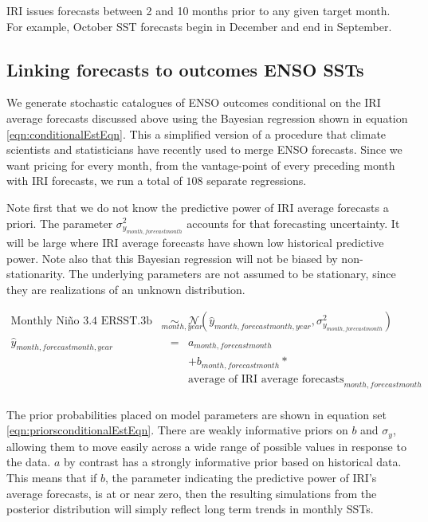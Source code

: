 \documentclass[authoryear]{article}
\begin{document}
IRI issues forecasts between 2 and 10 months prior to any given target month. For example, October SST forecasts begin in December and end in September. 

\subsection{Linking forecasts to outcomes ENSO SSTs}
We generate stochastic catalogues of ENSO outcomes conditional on the IRI average forecasts discussed above using the Bayesian regression shown in equation \ref{eqn:conditionalEstEqn}. This a simplified version of a procedure that climate scientists and statisticians have recently used to merge ENSO forecasts\cite{luo2007bayesian}\cite{coelho2004forecast}. Since we want pricing for every month, from the vantage-point of every preceding month with IRI forecasts, we run a total of $108$ separate regressions. 

Note first that we do not know the predictive power of IRI average forecasts a priori. The parameter $\sigma_{y_{month,forecast month}}^2$ accounts for that forecasting uncertainty. It will be large where IRI average forecasts have shown low historical predictive power. Note also that this Bayesian regression will not be biased by non-stationarity. The underlying parameters are not assumed to be stationary, since they are realizations of an unknown distribution.

\begin{equation}
\begin{array}{lcl}
\mbox{Monthly Ni\~no 3.4 ERSST.3b anomalies}_{month,year} & \sim & \mathcal{N}( \hat{y}_{month,forecast month,year}, \sigma_{y_{month,forecast month}}^2 )\\
\hat{y}_{month,forecast month,year} & = & a_{month,forecast month} \\
&& + b_{month,forecast month}*\\
&& \mbox{average of IRI average forecasts}_{month,forecast month}\\
\end{array}
\label{eqn:conditionalEstEqn}
\end{equation}

The prior probabilities placed on model parameters are shown in equation set \ref{eqn:priorsconditionalEstEqn}. There are weakly informative priors on $b$ and $\sigma_{y}$, allowing them to move easily across a wide range of possible values in response to the data. $a$ by contrast has a strongly informative prior based on historical data. This means that if $b$, the parameter indicating the predictive power of IRI's average forecasts, is at or near zero, then the resulting simulations from the posterior distribution will simply reflect long term trends in monthly SSTs.
\end{document}
